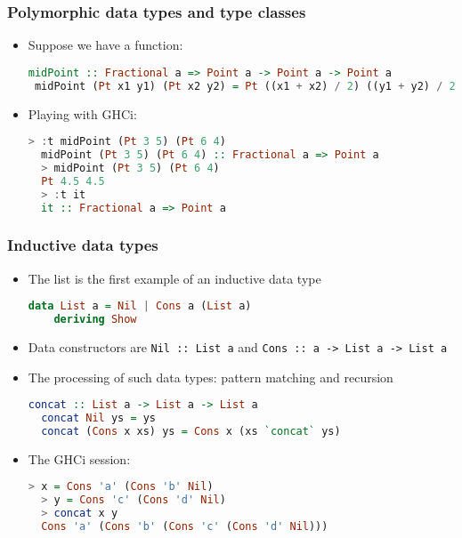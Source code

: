 \documentclass[10pt,pdf,utf8,russian,aspectratio=169]{beamer}
\begin{document}
\begin{frame}[fragile]
  \frametitle{Polymorphic data types and type classes}

\begin{itemize}
  \item Suppose we have a function:

  \begin{lstlisting}[language=Haskell]
 midPoint :: Fractional a => Point a -> Point a -> Point a
 midPoint (Pt x1 y1) (Pt x2 y2) = Pt ((x1 + x2) / 2) ((y1 + y2) / 2)
  \end{lstlisting}
  \item Playing with GHCi:
  \begin{lstlisting}[language=Haskell]
  > :t midPoint (Pt 3 5) (Pt 6 4)
  midPoint (Pt 3 5) (Pt 6 4) :: Fractional a => Point a
  > midPoint (Pt 3 5) (Pt 6 4)
  Pt 4.5 4.5
  > :t it
  it :: Fractional a => Point a
  \end{lstlisting}
\end{itemize}
\end{frame}

\begin{frame}[fragile]
  \frametitle{Inductive data types}

\begin{itemize}
  \item The list is the first example of an inductive data type

  \begin{lstlisting}[language=Haskell]
  data List a = Nil | Cons a (List a)
    deriving Show
  \end{lstlisting}
  \item Data constructors are \verb"Nil :: List a" and \verb"Cons :: a -> List a -> List a"
  \item The processing of such data types: pattern matching and recursion
  \begin{lstlisting}[language=Haskell]
  concat :: List a -> List a -> List a
  concat Nil ys = ys
  concat (Cons x xs) ys = Cons x (xs `concat` ys)
  \end{lstlisting}
  \item The GHCi session:
  \begin{lstlisting}[language=Haskell]
  > x = Cons 'a' (Cons 'b' Nil)
  > y = Cons 'c' (Cons 'd' Nil)
  > concat x y
  Cons 'a' (Cons 'b' (Cons 'c' (Cons 'd' Nil)))
  \end{lstlisting}
\end{itemize}
\end{frame}
\end{document}
